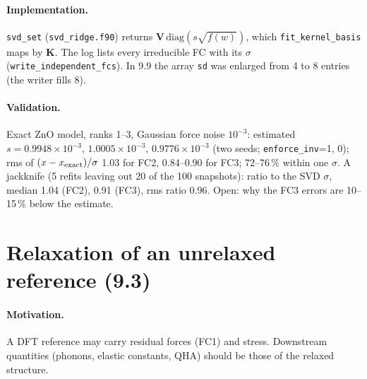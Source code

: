 \documentclass[11pt,a4paper]{article}
\newcommand{\bK}{\mathbf K}
\newcommand{\code}[1]{\texttt{#1}}
\begin{document}
\paragraph{Implementation.} \code{svd\_set} (\code{svd\_ridge.f90}) returns $\mathbf V\,\mathrm{diag}(s\sqrt{f(w)})$,
which \code{fit\_kernel\_basis} maps by $\bK$. The log lists every irreducible FC with its $\sigma$
(\code{write\_independent\_fcs}). In 9.9 the array \code{sd} was enlarged from 4 to 8 entries (the writer
fills 8).

\paragraph{Validation.} Exact ZnO model, ranks 1--3, Gaussian force noise $10^{-3}$: estimated
$s=0.9948\times10^{-3}$, $1.0005\times10^{-3}$, $0.9776\times10^{-3}$ (two seeds; \code{enforce\_inv}=1, 0);
rms of $(x-x_{\rm exact})/\sigma$ 1.03 for FC2, 0.84--0.90 for FC3; 72--76\,\% within one $\sigma$. A jackknife
(5 refits leaving out 20 of the 100 snapshots): ratio to the SVD $\sigma$, median 1.04 (FC2), 0.91 (FC3), rms
ratio 0.96. Open: why the FC3 errors are 10--15\,\% below the estimate.

\section{Relaxation of an unrelaxed reference (9.3)}\label{sec:relax}
\paragraph{Motivation.} A DFT reference may carry residual forces (FC1) and stress. Downstream quantities
(phonons, elastic constants, QHA) should be those of the relaxed structure.
\end{document}
